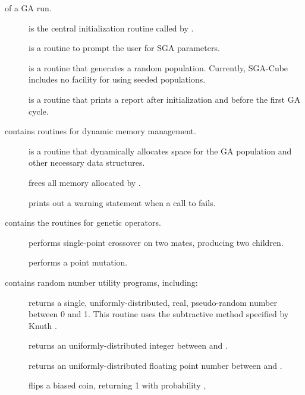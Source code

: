 \begin{description}
of a GA run.
\begin{description}
\item[{}] is the central initialization routine called by 
{}.
\item[{}] is a routine to prompt the user for SGA parameters.
\item[{}] is a routine that generates a random population. Currently, 
SGA-Cube includes no facility for using seeded populations.
\item[{}] is a routine that prints a report after initialization 
and before the first GA cycle.
\end{description}
\item[{\btt{memory.c}}] contains routines for dynamic memory management.  
\begin{description}
\item[{}] is a routine that dynamically allocates space for the GA 
population and other necessary data structures.
\item[{}] frees all memory allocated by {}.
\item[{}] prints out a warning statement
when a call to {} fails.
\end{description}
\item[{\btt{operators.c}}]  contains the routines for genetic operators.
\begin{description}
\item[{}] performs single-point crossover on two mates, producing
two children.
\item[{}] performs a point mutation.
\end{description}
\item[{\btt{random.c}}] contains random number utility programs, including:
\begin{description}
\item[{}] returns a single, uniformly-distributed, real, 
pseudo-random number between 0 and 1. 
This routine uses the subtractive method specified by Knuth \citeyear{Knuth:81}.
\item[{}] returns an uniformly-distributed integer between 
{} and {}.
\item[{}] returns an uniformly-distributed floating point number 
between  {} and {}.
\item[{}] flips a biased coin, returning 1 with probability {}, 

\end{description}
\end{description}
